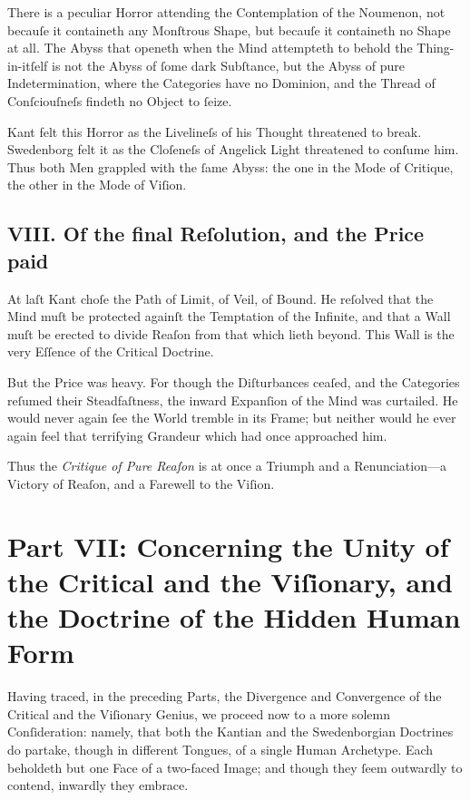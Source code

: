 \documentclass[12pt]{article}
\begin{document}
There is a peculiar Horror attending the Contemplation of the Noumenon, not 
becauſe it containeth any Monſtrous Shape, but becauſe it containeth no Shape 
at all. The Abyss that openeth when the Mind attempteth to behold the 
Thing-in-itſelf is not the Abyss of ſome dark Subſtance, but the Abyss of pure 
Indetermination, where the Categories have no Dominion, and the Thread of 
Conſciouſneſs findeth no Object to ſeize.

Kant felt this Horror as the Livelineſs of his Thought threatened to break. 
Swedenborg felt it as the Cloſeneſs of Angelick Light threatened to conſume 
him. Thus both Men grappled with the ſame Abyss: the one in the Mode of 
Critique, the other in the Mode of Viſion.

\subsection*{VIII. Of the final Reſolution, and the Price paid}

At laſt Kant choſe the Path of Limit, of Veil, of Bound. He reſolved that the 
Mind muſt be protected againſt the Temptation of the Infinite, and that a 
Wall muſt be erected to divide Reaſon from that which lieth beyond. This Wall 
is the very Eſſence of the Critical Doctrine.

But the Price was heavy. For though the Diſturbances ceaſed, and the Categories 
reſumed their Steadfaſtness, the inward Expanſion of the Mind was curtailed. 
He would never again ſee the World tremble in its Frame; but neither would he 
ever again feel that terrifying Grandeur which had once approached him.

Thus the \textit{Critique of Pure Reaſon} is at once a Triumph and a Renunciation—a 
Victory of Reaſon, and a Farewell to the Viſion.

\newpage

\section*{Part VII: Concerning the Unity of the Critical and the Viſionary, and the Doctrine of the Hidden Human Form}

Having traced, in the preceding Parts, the Divergence and Convergence of the 
Critical and the Viſionary Genius, we proceed now to a more solemn 
Conſideration: namely, that both the Kantian and the Swedenborgian Doctrines 
do partake, though in different Tongues, of a single Human Archetype. Each 
beholdeth but one Face of a two-faced Image; and though they ſeem outwardly 
to contend, inwardly they embrace.
\end{document}

